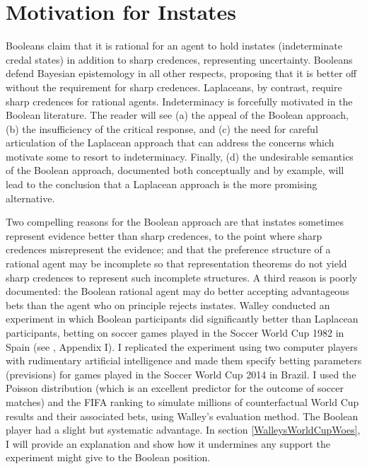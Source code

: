 \documentclass[11pt]{article}
\begin{document}

\section{Motivation for Instates}
\label{MotivationForIndeterminateCredalStates}

Booleans claim that it is rational for an agent to hold instates
(indeterminate credal states) in addition to sharp credences,
representing uncertainty. Booleans defend Bayesian epistemology in all
other respects, proposing that it is better off without the
requirement for sharp credences. Laplaceans, by contrast, require
sharp credences for rational agents.  Indeterminacy is forcefully
motivated in the Boolean literature. The reader will see (a) the
appeal of the Boolean approach, (b) the insufficiency of the critical
response, and (c) the need for careful articulation of the Laplacean
approach that can address the concerns which motivate some to resort
to indeterminacy. Finally, (d) the undesirable semantics of the
Boolean approach, documented both conceptually and by example, will
lead to the conclusion that a Laplacean approach is the more promising
alternative. 

Two compelling reasons for the Boolean approach are that instates
sometimes represent evidence better than sharp credences, to the point
where sharp credences misrepresent the evidence; and that the
preference structure of a rational agent may be incomplete so that
representation theorems do not yield sharp credences to represent such
incomplete structures. A third reason is poorly documented: the
Boolean rational agent may do better accepting advantageous bets than
the agent who on principle rejects instates. Walley conducted an
experiment in which Boolean participants did significantly better than
Laplacean participants, betting on soccer games played in the Soccer
World Cup 1982 in Spain (see , Appendix I). I
replicated the experiment using two computer players with rudimentary
artificial intelligence and made them specify betting parameters
(previsions) for games played in the Soccer World Cup 2014 in Brazil.
I used the Poisson distribution (which is an excellent predictor for
the outcome of soccer matches) and the FIFA ranking to simulate
millions of counterfactual World Cup results and their associated
bets, using Walley's evaluation method. The Boolean player had a
slight but systematic advantage. In section \ref{WalleysWorldCupWoes},
I will provide an explanation and show how it undermines any support
the experiment might give to the Boolean position.
\end{document}
